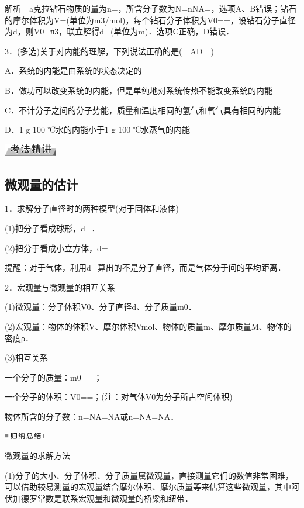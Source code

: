 解析　a克拉钻石物质的量为n=，所含分子数为N=nNA=，选项A、B错误；钻石的摩尔体积为V=(单位为m3/mol)，每个钻石分子体积为V0==，设钻石分子直径为d，则V0=π3，联立解得d=(单位为m)．选项C正确，D错误．

3．(多选)关于对内能的理解，下列说法正确的是(　AD　)

A．系统的内能是由系统的状态决定的

B．做功可以改变系统的内能，但是单纯地对系统传热不能改变系统的内能

C．不计分子之间的分子势能，质量和温度相同的氢气和氧气具有相同的内能

D．1 g 100 ℃水的内能小于1 g 100 ℃水蒸气的内能


\begin{center}\includegraphics[width=0.92431in,height=0.21667in]{media/image11.png}\end{center}
\subsection{微观量的估计}

1．求解分子直径时的两种模型(对于固体和液体)

(1)把分子看成球形，d=．

(2)把分于看成小立方体，d=

提醒：对于气体，利用d=算出的不是分子直径，而是气体分于间的平均距离．

2．宏观量与微观量的相互关系

(1)微观量：分子体积V0、分子直径d、分子质量m0．

(2)宏观量：物体的体积V、摩尔体积Vmol、物体的质量m、摩尔质量M、物体的密度ρ．

(3)相互关系

一个分子的质量：m0==；

一个分子的体积：V0==；(注：对气体V0为分子所占空间体积)

物体所含的分子数：n=NA=NA或n=NA=NA．

\begin{center}\includegraphics[width=0.70764in,height=0.12292in]{media/image13.png}\end{center}
微观量的求解方法

(1)分子的大小、分子体积、分子质量属微观量，直接测量它们的数值非常困难，可以借助较易测量的宏观量结合摩尔体积、摩尔质量等来估算这些微观量，其中阿伏加德罗常数是联系宏观量和微观量的桥梁和纽带．

